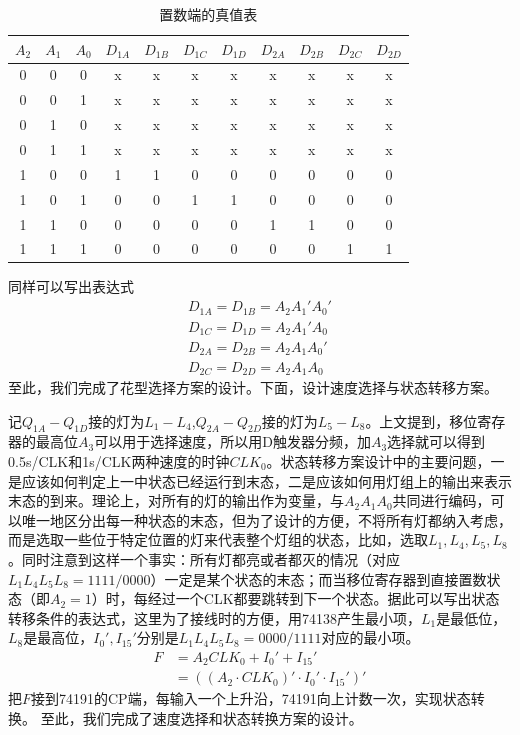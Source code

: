 \documentclass{ctexart}
\begin{document}
\begin{table}[H]
    \centering
    \caption{置数端的真值表}
    \begin{tabular}{ccc|cccc|cccc}
    \hline 
        $A_2$ & $A_1$ & $A_0$ & $D_{1A}$ & $D_{1B}$ & $D_{1C}$ & $D_{1D}$ & $D_{2A}$& $D_{2B}$ & $D_{2C}$ & $D_{2D}$\\ \hline 
        0 & 0 & 0 & x & x & x & x & x & x & x & x \\ \hline
        0 & 0 & 1 & x & x & x & x & x & x & x & x \\ \hline
        0 & 1 & 0 & x & x & x & x & x & x & x & x \\ \hline
        0 & 1 & 1 & x & x & x & x & x & x & x & x \\ \hline
        1 & 0 & 0 & 1 & 1 & 0 & 0 & 0 & 0 & 0 & 0 \\ \hline
        1 & 0 & 1 & 0 & 0 & 1 & 1 & 0 & 0 & 0 & 0 \\ \hline
        1 & 1 & 0 & 0 & 0 & 0 & 0 & 1 & 1 & 0 & 0 \\ \hline
        1 & 1 & 1 & 0 & 0 & 0 & 0 & 0 & 0 & 1 & 1 \\ \hline
    \end{tabular}
    \label{置数端的真值表}
\end{table}
同样可以写出表达式
\begin{align}
    D_{1A}=D_{1B}=A_2 A_1' A_0'\\
    D_{1C}=D_{1D}=A_2 A_1' A_0\\
    D_{2A}=D_{2B}=A_2 A_1 A_0'\\
    D_{2C}=D_{2D}=A_2 A_1 A_0
\end{align}
至此，我们完成了花型选择方案的设计。下面，设计速度选择与状态转移方案。

记$Q_{1A}-Q_{1D}$接的灯为$L_1-L_4$,$Q_{2A}-Q_{2D}$接的灯为$L_5-L_8$。上文提到，移位寄存器的最高位$A_3$可以用于选择速度，所以用D触发器分频，加$A_3$选择就可以得到0.5s/CLK和1s/CLK两种速度的时钟$CLK_0$。状态转移方案设计中的主要问题，一是应该如何判定上一中状态已经运行到末态，二是应该如何用灯组上的输出来表示末态的到来。理论上，对所有的灯的输出作为变量，与$A_2 A_1 A_0$共同进行编码，可以唯一地区分出每一种状态的末态，但为了设计的方便，不将所有灯都纳入考虑，而是选取一些位于特定位置的灯来代表整个灯组的状态，比如，选取$L_1,L_4,L_5,L_8$。同时注意到这样一个事实：所有灯都亮或者都灭的情况（对应$L_1 L_4 L_5L_8=1111/0000$）一定是某个状态的末态；而当移位寄存器到直接置数状态（即$A_2=1$）时，每经过一个CLK都要跳转到下一个状态。据此可以写出状态转移条件的表达式，这里为了接线时的方便，用74138产生最小项，$L_1$是最低位，$L_8$是最高位，$I_0',I_{15}'$分别是$L_1 L_4 L_5L_8=0000/1111$对应的最小项。
\begin{align}
    F&=A_2 CLK_0 + I_0'+I_{15}'\\
    &=((A_2 \cdot CLK_0)'\cdot I_0' \cdot I_{15}')'
\end{align}
把$F$接到74191的CP端，每输入一个上升沿，74191向上计数一次，实现状态转换。
至此，我们完成了速度选择和状态转换方案的设计。
\end{document}
